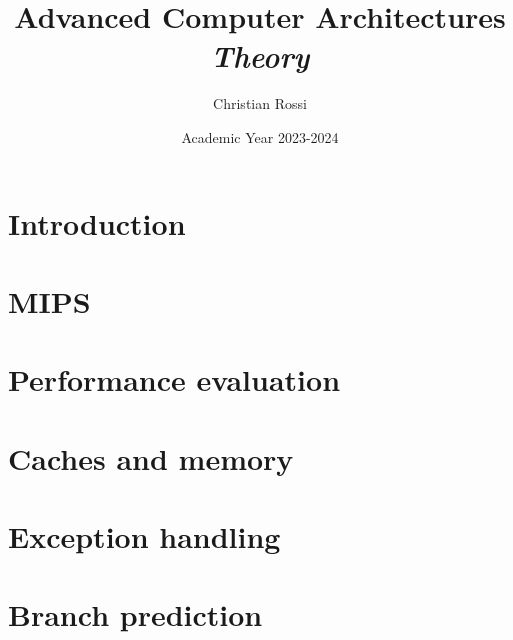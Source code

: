 \documentclass[12pt, a4paper]{report}
\title{Advanced Computer Architectures \\ \textit{Theory}}
\author{Christian Rossi}
\date{Academic Year 2023-2024}
\begin{document}
    \maketitle

    

    \cleardoublepage

    \tableofcontents

    \cleardoublepage

    \chapter{Introduction}
    

    \chapter{MIPS}
    
    
    

    \chapter{Performance evaluation}
    
    
    
    
    

    \chapter{Caches and memory}
    
    
    
    

    \chapter{Exception handling}
    
    
    
    

    \chapter{Branch prediction}
    
    
    
\end{document}
